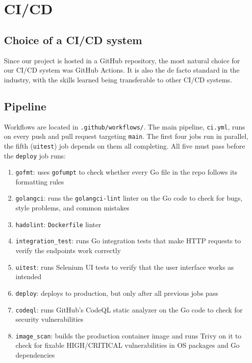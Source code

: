 \section{CI/CD}

\subsection{Choice of a CI/CD system}

Since our project is hosted in a GitHub repository, the most natural choice for our CI/CD system was GitHub Actions. It is also the de facto standard in the industry, with the skills learned being transferable to other CI/CD systems.

\subsection{Pipeline}
Workflows are located in \texttt{.github/workflows/}. The main pipeline, \texttt{ci.yml}, runs on every push and pull request targeting \texttt{main}. The first four jobs run in parallel, the fifth (\texttt{uitest}) job depends on them all completing. All five must pass before the \texttt{deploy} job runs:

\begin{enumerate}
    \item \texttt{gofmt}: uses \texttt{gofumpt} to check whether every Go file in the repo follows its formatting rules
    \item \texttt{golangci}: runs the \texttt{golangci-lint} linter on the Go code to check for bugs, style problems, and common mistakes
    \item \texttt{hadolint}: \texttt{Dockerfile} linter
    \item \texttt{integration\_test}: runs Go integration tests that make HTTP requests to verify the endpoints work correctly
    \item \texttt{uitest}: runs Selenium UI tests to verify that the user interface works as intended
    \item \texttt{deploy}: deploys to production, but only after all previous jobs pass
    \item \texttt{codeql}: runs GitHub's CodeQL static analyzer on the Go code to check for security vulnerabilities
    \item \texttt{image\_scan}: builds the production container image and runs Trivy on it to check for fixable HIGH/CRITICAL vulnerabilities in OS packages and Go dependencies
\end{enumerate}

